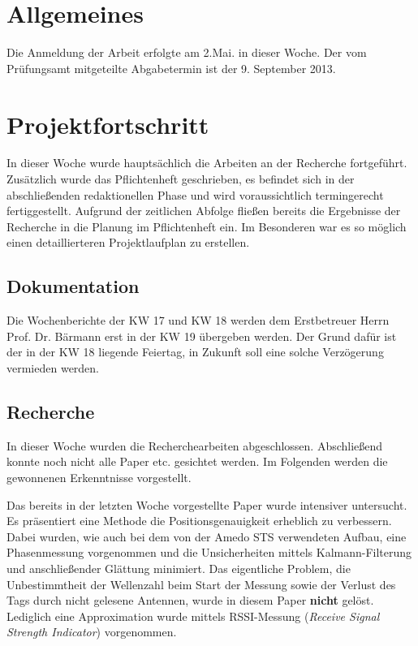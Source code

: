 \documentclass[a4paper,12pt,fleqn]{article}
\begin{document}
\setlength{\headheight}{36pt}

\begin{titlepage}



\end{titlepage}

\section[Allgemeines]{Allgemeines}
Die Anmeldung der Arbeit erfolgte am 2.Mai. in dieser Woche. Der vom Prüfungsamt mitgeteilte Abgabetermin ist der 9. September 2013.

\section[Fortschritt]{Projektfortschritt}
In dieser Woche wurde hauptsächlich die Arbeiten an der Recherche fortgeführt. Zusätzlich wurde das Pflichtenheft geschrieben, es befindet sich in der abschließenden redaktionellen Phase und wird voraussichtlich termingerecht fertiggestellt. Aufgrund der zeitlichen Abfolge fließen bereits die Ergebnisse der Recherche in die Planung im Pflichtenheft ein. Im Besonderen war es so möglich einen detaillierteren Projektlaufplan zu erstellen.

\subsection{Dokumentation}
Die Wochenberichte der KW 17 und KW 18 werden dem Erstbetreuer Herrn Prof. Dr. Bärmann erst in der KW 19 übergeben werden. Der Grund dafür ist der in der KW 18 liegende Feiertag, in Zukunft soll eine solche Verzögerung vermieden werden.

\subsection{Recherche}
In dieser Woche wurden die Recherchearbeiten abgeschlossen. Abschließend konnte noch nicht alle Paper etc. gesichtet werden. Im Folgenden werden die gewonnenen Erkenntnisse vorgestellt.

Das bereits in der letzten Woche vorgestellte Paper \cite{KALMANandSMOOTHING} wurde intensiver untersucht. Es präsentiert eine Methode die Positionsgenauigkeit erheblich zu verbessern. Dabei wurden, wie auch bei dem von der Amedo STS verwendeten Aufbau, eine Phasenmessung vorgenommen und die Unsicherheiten mittels Kalmann-Filterung und anschließender Glättung minimiert. Das eigentliche Problem, die Unbestimmtheit der Wellenzahl beim Start der Messung sowie der Verlust des Tags durch nicht gelesene Antennen, wurde in diesem Paper \textbf{nicht} gelöst. Lediglich eine Approximation wurde mittels RSSI-Messung (\textit{Receive Signal Strength Indicator}) vorgenommen.
\end{document}
